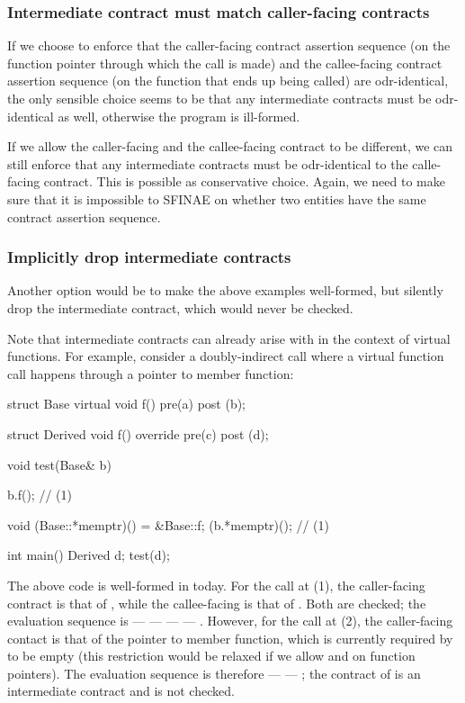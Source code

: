 
\subsubsection{Intermediate contract must match caller-facing contracts}
\label{intermediatematch}

If we choose to enforce that the caller-facing contract assertion sequence (on the function pointer through which the call is made) and the callee-facing contract assertion sequence (on the function that ends up being called) are odr-identical, the only sensible choice seems to be that any intermediate contracts must be odr-identical as well, otherwise the program is ill-formed.

If we allow the caller-facing and the callee-facing contract to be different, we can still enforce that any intermediate contracts must be odr-identical to the calle-facing contract. This is possible as conservative choice. Again, we need to make sure that it is impossible to SFINAE on whether two entities have the same contract assertion sequence. 

\subsubsection{Implicitly drop intermediate contracts}
\label{implicitdrop}

Another option would be to make the above examples well-formed, but silently drop the intermediate contract, which would never be checked. 

Note that intermediate contracts can already arise with \cite{P2900R8} in the context of virtual functions. For example, consider a doubly-indirect call where a virtual function call happens through a pointer to member function:
\begin{codeblock}
struct Base {
  virtual void f() pre(a) post (b);
}

struct Derived {
  void f() override pre(c) post (d);
}

void test(Base& b) {
  b.f();  // (1)
  
  void (Base::*memptr)() = &Base::f;
  (b.*memptr)();  // (1)
}

int main() {
  Derived d;
  test(d);
}
\end{codeblock}
The above code is well-formed in \cite{P2900R8} today. For the call at (1), the caller-facing contract is that of , while the callee-facing is that of . Both are checked; the evaluation sequence is  ---  ---  ---  --- . However, for the call at (2), the caller-facing contact is that of the pointer to member function, which is currently required by \cite{P2900R8} to be empty (this restriction would be relaxed if we allow  and  on function pointers). The evaluation sequence is therefore  ---  --- ; the contract of  is an intermediate contract and is not checked.

